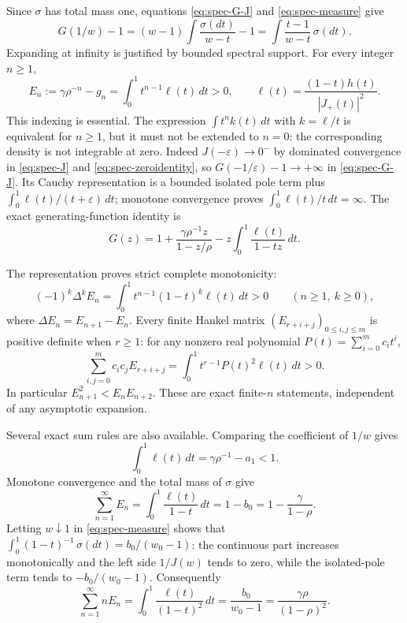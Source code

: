 Since $\sigma$ has total mass one, equations
\eqref{eq:spec-G-J} and \eqref{eq:spec-measure} give
\[
 G(1/w)-1=(w-1)\int\frac{\sigma(dt)}{w-t}-1
         =\int\frac{t-1}{w-t}\,\sigma(dt).
\]
Expanding at infinity is justified by bounded spectral support.
For every integer $n\ge1$,
\begin{equation}
 \boxed{\quad
 E_n:=\gamma\rho^{-n}-g_n
     =\int_0^1t^{n-1}\ell(t)\,dt>0,
 \qquad
 \ell(t)=\frac{(1-t)h(t)}{|J_+(t)|^2}.
 \quad}
 \label{eq:spec-exact-remainder}
\end{equation}
This indexing is essential.  The expression
$\int t^nk(t)\,dt$ with $k=\ell/t$ is equivalent for $n\ge1$,
but it must not be extended to $n=0$: the corresponding density is
not integrable at zero.  Indeed $J(-\varepsilon)\to0^-$ by dominated
convergence in \eqref{eq:spec-J} and \eqref{eq:spec-zeroidentity}, so
$G(-1/\varepsilon)-1\to+\infty$ in
\eqref{eq:spec-G-J}.  Its Cauchy representation is a bounded isolated
pole term plus $\int_0^1\ell(t)/(t+\varepsilon)\,dt$; monotone
convergence proves $\int_0^1\ell(t)/t\,dt=\infty$.
The exact generating-function identity is
\begin{equation}
 G(z)=1+\frac{\gamma\rho^{-1}z}{1-z/\rho}
             -z\int_0^1\frac{\ell(t)}{1-tz}\,dt.
 \label{eq:spec-regularized-generating}
\end{equation}

The representation proves strict complete monotonicity:
\begin{equation}
 (-1)^k\Delta^k E_n
 =\int_0^1t^{n-1}(1-t)^k\ell(t)\,dt>0
 \qquad(n\ge1,\ k\ge0),
 \label{eq:spec-complete-monotone}
\end{equation}
where $\Delta E_n=E_{n+1}-E_n$.  Every finite Hankel matrix
$(E_{r+i+j})_{0\le i,j\le m}$ is positive definite when $r\ge1$:
for any nonzero real polynomial $P(t)=\sum_{i=0}^mc_it^i$,
\[
 \sum_{i,j=0}^mc_ic_jE_{r+i+j}
 =\int_0^1t^{r-1}P(t)^2\ell(t)\,dt>0.
\]
In particular $E_{n+1}^2<E_nE_{n+2}$.  These are exact finite-$n$
statements, independent of any asymptotic expansion.

Several exact sum rules are also available.  Comparing the coefficient
of $1/w$ gives
\begin{equation}
 \int_0^1\ell(t)\,dt=\gamma\rho^{-1}-a_1<1.
 \label{eq:spec-massell}
\end{equation}
Monotone convergence and the total mass of $\sigma$ give
\begin{equation}
 \sum_{n=1}^\infty E_n
 =\int_0^1\frac{\ell(t)}{1-t}\,dt
 =1-b_0=1-\frac\gamma{1-\rho}.
 \label{eq:spec-sum0}
\end{equation}
Letting $w\downarrow1$ in \eqref{eq:spec-measure} shows that
$\int_0^1(1-t)^{-1}\,\sigma(dt)=b_0/(w_0-1)$: the continuous
part increases monotonically and the left side $1/J(w)$ tends to zero,
while the isolated-pole term tends to $-b_0/(w_0-1)$.  Consequently
\begin{equation}
 \sum_{n=1}^\infty nE_n
 =\int_0^1\frac{\ell(t)}{(1-t)^2}\,dt
 =\frac{b_0}{w_0-1}
 =\frac{\gamma\rho}{(1-\rho)^2}.
 \label{eq:spec-sum1}
\end{equation}


